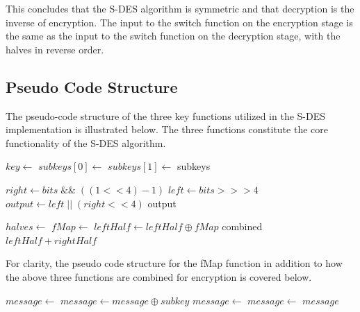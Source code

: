 \documentclass[]{article}
\begin{document}
\noindent
This concludes that the S-DES algorithm is symmetric and that decryption is the inverse of encryption. The input to the switch function on the encryption stage is the same as the input to the switch function on the decryption stage, with the halves in reverse order.

\newpage
\subsection*{Pseudo Code Structure}

The pseudo-code structure of the three key functions utilized in the S-DES implementation is illustrated below. The three functions constitute the core functionality of the S-DES algorithm.\\

\begin{algorithmic}
	\State $key\gets $ 
	\State {}
	\State $subkeys[0]\gets $ 
	\State {}
	\State $subkeys[1]\gets $ 
	\State \Return subkeys
\EndFunction
\end{algorithmic}


\vspace{0.5cm}

\begin{algorithmic}
		\State $ right \gets bits \;\&\&\; ( ( 1 << 4 ) - 1 ) $
		\State $ left \gets bits >>> 4 $
		\State $ output \gets left \;||\; ( right << 4 )$
		\State \Return output
	\EndFunction
\end{algorithmic}

\vspace{0.5cm}

\begin{algorithmic}
	
	\State $halves\gets $ 
	\State $fMap \gets $ 	
	\State $ leftHalf \gets leftHalf \oplus fMap $
	\State \Return combined $ leftHalf + rightHalf $
	\EndFunction
\end{algorithmic}

\vspace{0.5cm}
\noindent
For clarity, the pseudo code structure for the fMap function in addition to how the above three functions are combined for encryption is covered below.
\vspace{0.5cm}
\begin{algorithmic}
	
	\State $message\gets $ 
	\State $ message \gets message \oplus subkey $
	\State $ message \gets $ 	
	\State $message\gets $ 	
	\State \Return $message$
	\EndFunction
\end{algorithmic}
\end{document}
